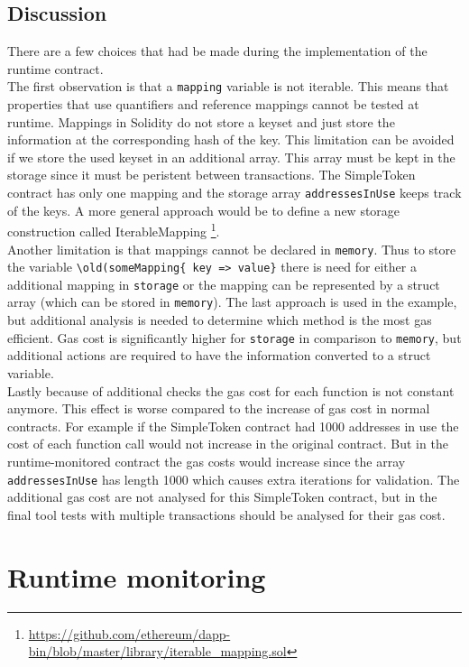 \documentclass[a4paper]{article}
\begin{document}
\subsection{Discussion}
There are a few choices that had be made during the implementation of the runtime contract. \\
The first observation is that a \texttt{mapping} variable is not iterable. This means that properties that use quantifiers and reference mappings cannot be tested at runtime. Mappings in Solidity do not store a keyset and just store the information at the corresponding hash of the key.  This limitation can be avoided if we store the used keyset in an additional array. This array must be kept in the storage since it must be peristent between transactions. The SimpleToken contract has only one mapping and the storage array \texttt{addressesInUse} keeps track of the keys. A more general approach would be to define a new storage construction called IterableMapping \footnote{\url{https://github.com/ethereum/dapp-bin/blob/master/library/iterable_mapping.sol}}. \\
Another limitation is that mappings cannot be declared in \texttt{memory}. Thus to store the variable \texttt{\textbackslash old(someMapping\{ key => value\}} there is  need for either a additional mapping in \texttt{storage} or the mapping can be represented by a struct array (which can be stored in \texttt{memory}). The last approach is used in the example, but additional analysis is needed to determine which method is the most gas efficient. Gas cost is significantly higher for \texttt{storage} in comparison to \texttt{memory}, but additional actions are required to have the information converted to a struct variable.\\
Lastly because of additional checks the gas cost for each function is not constant anymore. This effect is worse compared to the increase of gas cost in normal contracts. For example if the SimpleToken contract had 1000 addresses in use the cost of each function call would not increase in the original contract. But in the runtime-monitored contract the gas costs would increase since the array \texttt{addressesInUse} has length 1000 which causes extra iterations for validation. The additional gas cost are not analysed for this SimpleToken contract, but in the final tool tests with multiple transactions should be analysed for their gas cost.


\section{Runtime monitoring} 
\end{document}
